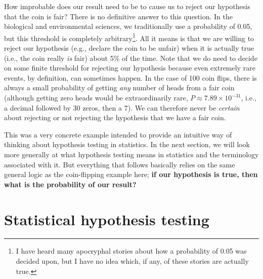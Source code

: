 \documentclass[
]{scrbook}
\begin{document}
How improbable does our result need to be to cause us to reject our hypothesis that the coin is fair?
There is no definitive answer to this question.
In the biological and environmental sciences, we traditionally use a probability of 0.05, but this threshold is completely arbitrary\footnote{I have heard many apocryphal stories about how a probability of 0.05 was decided upon, but I have no idea which, if any, of these stories are actually true.}.
All it means is that we are willing to reject our hypothesis (e.g., declare the coin to be unfair) when it is actually true (i.e., the coin really \emph{is} fair) about 5\% of the time.
Note that we do need to decide on some finite threshold for rejecting our hypothesis because even extremely rare events, by definition, can sometimes happen.
In the case of 100 coin flips, there is always a small probability of getting \emph{any} number of heads from a fair coin (although getting zero heads would be extraordinarily rare, \(P \approx 7.89 \times 10^{-31}\), i.e., a decimal followed by 30 zeros, then a 7).
We can therefore never be \emph{certain} about rejecting or not rejecting the hypothesis that we have a fair coin.

This was a very concrete example intended to provide an intuitive way of thinking about hypothesis testing in statistics.
In the next section, we will look more generally at what hypothesis testing means in statistics and the terminology associated with it.
But everything that follows basically relies on the same general logic as the coin-flipping example here; \textbf{if our hypothesis is true, then what is the probability of our result?}

\hypertarget{statistical-hypothesis-testing}{%
\section{Statistical hypothesis testing}\label{statistical-hypothesis-testing}}
\end{document}
